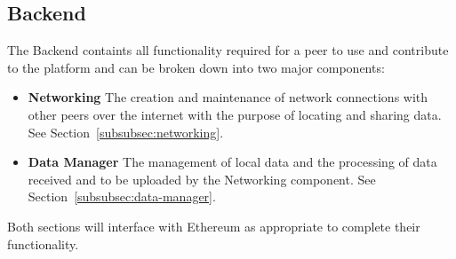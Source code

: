 \subsection{Backend}\label{subsec:backend}

The Backend containts all functionality required for a peer to use and contribute to the platform and can be broken down into two major components:

\begin{itemize}
  \item \textbf{Networking} The creation and maintenance of network connections with other peers over the internet with the purpose of locating and sharing data. See Section~\ref{subsubsec:networking}.
  \item \textbf{Data Manager} The management of local data and the processing of data received and to be uploaded by the Networking component. See Section~\ref{subsubsec:data-manager}.
\end{itemize}

\newparagraph
Both sections will interface with Ethereum as appropriate to complete their functionality. 



